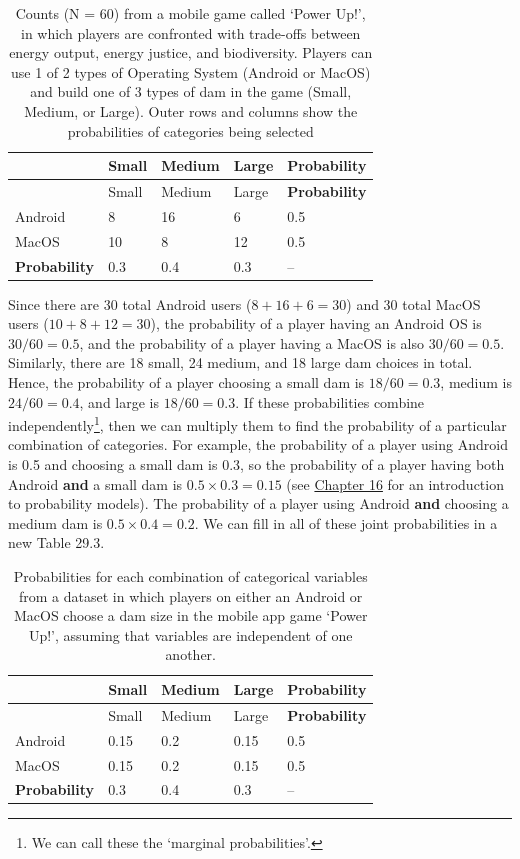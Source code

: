 \documentclass[
]{scrbook}
\begin{document}
\begin{longtable}[]{@{}lllll@{}}
\caption{\label{tab:unnamed-chunk-141}Counts (N = 60) from a mobile game called `Power Up!', in which players are confronted with trade-offs between energy output, energy justice, and biodiversity. Players can use 1 of 2 types of Operating System (Android or MacOS) and build one of 3 types of dam in the game (Small, Medium, or Large). Outer rows and columns show the probabilities of categories being selected}\tabularnewline
\toprule
& Small & Medium & Large & \textbf{Probability} \\
\midrule
\endfirsthead
\toprule
& Small & Medium & Large & \textbf{Probability} \\
\midrule
\endhead
Android & 8 & 16 & 6 & 0.5 \\
MacOS & 10 & 8 & 12 & 0.5 \\
\textbf{Probability} & 0.3 & 0.4 & 0.3 & -- \\
\bottomrule
\end{longtable}

Since there are 30 total Android users (\(8 + 16 + 6 = 30\)) and 30 total MacOS users (\(10 + 8 + 12 = 30\)), the probability of a player having an Android OS is \(30/60 = 0.5\), and the probability of a player having a MacOS is also \(30 / 60 = 0.5\).
Similarly, there are 18 small, 24 medium, and 18 large dam choices in total.
Hence, the probability of a player choosing a small dam is \(18/60 = 0.3\), medium is \(24/60 = 0.4\), and large is \(18/60 = 0.3\).
If these probabilities combine independently\footnote{We can call these the `marginal probabilities'.}, then we can multiply them to find the probability of a particular combination of categories.
For example, the probability of a player using Android is 0.5 and choosing a small dam is 0.3, so the probability of a player having both Android \textbf{and} a small dam is \(0.5 \times 0.3 = 0.15\) (see \protect\hyperlink{Chapter_16}{Chapter 16} for an introduction to probability models).
The probability of a player using Android \textbf{and} choosing a medium dam is \(0.5 \times 0.4 = 0.2\).
We can fill in all of these joint probabilities in a new Table 29.3.

\begin{longtable}[]{@{}lllll@{}}
\caption{\label{tab:unnamed-chunk-142}Probabilities for each combination of categorical variables from a dataset in which players on either an Android or MacOS choose a dam size in the mobile app game `Power Up!', assuming that variables are independent of one another.}\tabularnewline
\toprule
& Small & Medium & Large & \textbf{Probability} \\
\midrule
\endfirsthead
\toprule
& Small & Medium & Large & \textbf{Probability} \\
\midrule
\endhead
Android & 0.15 & 0.2 & 0.15 & 0.5 \\
MacOS & 0.15 & 0.2 & 0.15 & 0.5 \\
\textbf{Probability} & 0.3 & 0.4 & 0.3 & -- \\
\bottomrule
\end{longtable}
\end{document}
